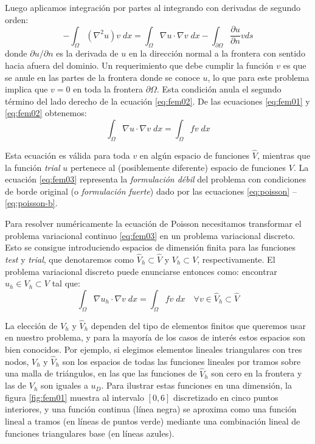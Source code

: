 Luego aplicamos integración por partes al integrando con derivadas de segundo orden:
\begin{equation}\label{eq:fem02}
 -\int_{\Omega} (\nabla^2 u) v \; dx = \int_{\Omega} \nabla u \cdot \nabla v \; dx - \int_{\partial \Omega} \frac{\partial u}{\partial n} v ds
\end{equation} 
donde $\partial u / \partial n$ es la derivada de $u$ en la dirección normal a la frontera con sentido hacia afuera del dominio. Un requerimiento que debe cumplir la función $v$ es que se anule en las partes de la frontera donde se conoce $u$, lo que para este problema implica que $v=0$ en toda la frontera $\partial \Omega$. Esta condición anula el segundo término del lado derecho de la ecuación \eqref{eq:fem02}. De las ecuaciones \eqref{eq:fem01} y \eqref{eq:fem02} obtenemos:
\begin{equation}\label{eq:fem03}
 \int_{\Omega} \nabla u \cdot \nabla v \; dx = \int_{\Omega} f v \; dx
\end{equation} 

Esta ecuación es válida para toda $v$ en algún espacio de funciones $\hat{V}$, mientras que la función \textit{trial} $u$ pertenece al (posiblemente diferente) espacio de funciones $V$. La ecuación \eqref{eq:fem03} representa la \textit{formulación débil} del problema con condiciones de borde original (o \textit{formulación fuerte}) dado por las ecuaciones \eqref{eq:poisson} -- \eqref{eq:poisson-b}.

Para resolver numéricamente la ecuación de Poisson necesitamos transformar el problema variacional continuo \eqref{eq:fem03} en un problema variacional discreto. Esto se consigue introduciendo espacios de dimensión finita para las funciones \textit{test} y \textit{trial}, que denotaremos como $\hat{V}_h \subset \hat{V}$ y $V_h \subset V$, respectivamente. El problema variacional discreto puede enunciarse entonces como: encontrar $u_h \in V_h \subset V$ tal que:
\begin{equation} \label{eq:fem04}
 \int_{\Omega} \nabla u_h \cdot \nabla v \; dx = \int_{\Omega} f v \; dx \quad \forall v \in \hat{V}_h \subset \hat{V}
\end{equation} 

La elección de $V_h$ y $\hat{V}_h$ dependen del tipo de elementos finitos que queremos usar en nuestro problema, y para la mayoría de los casos de interés estos espacios son bien conocidos. Por ejemplo, si elegimos elementos lineales triangulares con tres nodos, $V_h$ y $\hat{V}_h$ son los espacios de todas las funciones lineales por tramos sobre una malla de triángulos, en las que las funciones de $\hat{V}_h$ son cero en la frontera y las de $V_h$ son iguales a $u_D$. Para ilustrar estas funciones en una dimensión, la figura \ref{fig:fem01} muestra al intervalo $[0, 6]$ discretizado en cinco puntos interiores, y una función continua (línea negra) se aproxima como una función lineal a tramos (en líneas de puntos verde) mediante una combinación lineal de funciones triangulares base (en líneas azules).

